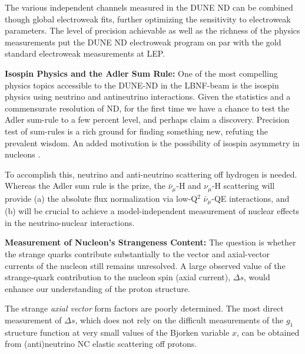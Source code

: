 The various independent channels measured in the DUNE ND can be combined though global electroweak fits, 
further optimizing the sensitivity to electroweak parameters. The level of precision achievable as well as the richness of 
the physics measurements put the DUNE ND electroweak program on par with the gold standard electroweak measurements at LEP.   



\vspace{0.25cm} 
\noindent 
{\bf Isospin Physics and the Adler Sum Rule:} One of the most compelling physics topics 
accessible to the DUNE-ND in the LBNF-beam is the isospin physics 
using neutrino and antineutrino interactions. Given the statistics and a commensurate 
resolution of ND, for the first time we have a chance to test the Adler sum-rule to a 
few percent level, and perhaps claim a discovery. 
Precision test of sum-rules is a rich ground for finding something new, refuting the prevalent wisdom. 
An added motivation is the possibility of isospin asymmetry in nucleons . 

To accomplish this, neutrino and anti-neutrino scattering off hydrogen is needed. 
Whereas the Adler sum rule is the prize, the $\bar \nu_\mu$-H and $\nu_\mu$-H scattering
will provide (a)  the 
absolute flux normalization via low-Q$^2$ $\bar \nu_\mu$-QE interactions,  
and (b) will be crucial to achieve a model-independent measurement of nuclear effects in the 
neutrino-nuclear interactions. 

\vspace{0.25cm} 
\noindent 
{\bf Measurement of Nucleon's Strangeness Content:} The question is whether the strange
  quarks contribute substantially to the vector and axial-vector
  currents of the nucleon still remains unresolved. A large observed value of the
  strange-quark contribution to the nucleon spin (axial current),
  $\Delta s$, would enhance our understanding of the proton structure.

The strange \emph{axial vector} form factors are poorly 
determined. The most direct measurement of $\Delta s$, which does not rely on the difficult
measurements of the $g_1$ structure function at very small values of the Bjorken variable $x$, 
can be obtained from (anti)neutrino NC elastic scattering off protons.  %

